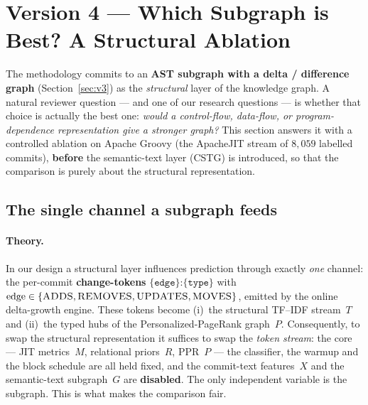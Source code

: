 \documentclass[11pt,a4paper]{article}
\newcommand{\edge}[1]{\textsc{#1}}
\begin{document}
	\section{Version 4 --- Which Subgraph is Best? A Structural Ablation}\label{sec:v4}

	The methodology commits to an \textbf{AST subgraph with a delta / difference
	graph} (Section~\ref{sec:v3}) as the \emph{structural} layer of the knowledge
	graph. A natural reviewer question --- and one of our research questions --- is
	whether that choice is actually the best one: \emph{would a control-flow,
	data-flow, or program-dependence representation give a stronger graph?} This
	section answers it with a controlled ablation on Apache Groovy (the ApacheJIT
	stream of $8{,}059$ labelled commits), \textbf{before} the semantic-text layer
	(CSTG) is introduced, so that the comparison is purely about the structural
	representation.

	\subsection{The single channel a subgraph feeds}\label{sec:v4-channel}
	\paragraph{Theory.} In our design a structural layer influences prediction
	through exactly \emph{one} channel: the per-commit \textbf{change-tokens}
	$\texttt{\{edge\}:\{type\}}$ with $\text{edge}\in\{\edge{ADDS},\edge{REMOVES},
	\edge{UPDATES},\edge{MOVES}\}$, emitted by the online delta-growth engine. These
	tokens become (i)~the structural TF--IDF stream~$T$ and (ii)~the typed hubs of
	the Personalized-PageRank graph~$P$. Consequently, to swap the structural
	representation it suffices to swap the \emph{token stream}: the core --- JIT
	metrics~$M$, relational priors~$R$, PPR~$P$ --- the classifier, the warmup and
	the block schedule are all held fixed, and the commit-text features~$X$ and the
	semantic-text subgraph~$G$ are \textbf{disabled}. The only independent variable
	is the subgraph. This is what makes the comparison fair.
\end{document}
